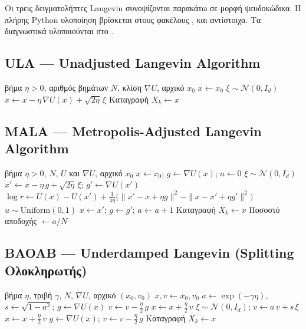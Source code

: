 Οι τρεις δειγματολήπτες Langevin συνοψίζονται παρακάτω σε μορφή ψευδοκώδικα.
Η πλήρης Python υλοποίηση βρίσκεται στους φακέλους
,  και
 αντίστοιχα. Τα διαγνωστικά
υλοποιούνται στο .

\subsection*{ULA --- Unadjusted Langevin Algorithm}

\begin{algorithmic}[1]
\Require βήμα $\eta > 0$, αριθμός βημάτων $N$, κλίση $\nabla U$, αρχικό $x_0$
\State $x \gets x_0$
  \State $\xi \sim \mathcal{N}(0, I_d)$
  \State $x \gets x - \eta\, \nabla U(x) + \sqrt{2\eta}\,\xi$
  \State Καταγραφή $X_k \gets x$
\EndFor
\end{algorithmic}

\subsection*{MALA --- Metropolis-Adjusted Langevin Algorithm}

\begin{algorithmic}[1]
\Require βήμα $\eta > 0$, $N$, $U$ και $\nabla U$, αρχικό $x_0$
\State $x \gets x_0$; $g \gets \nabla U(x)$; $a \gets 0$
  \State $\xi \sim \mathcal{N}(0, I_d)$
  \State $x' \gets x - \eta\, g + \sqrt{2\eta}\,\xi$; \quad $g' \gets \nabla U(x')$
  \State $\log r \gets U(x) - U(x') + \frac{1}{4\eta}\bigl(\|x' - x + \eta g\|^2 - \|x - x' + \eta g'\|^2\bigr)$
  \State $u \sim \mathrm{Uniform}(0,1)$
    \State $x \gets x'$; $g \gets g'$; $a \gets a + 1$
  \EndIf
  \State Καταγραφή $X_k \gets x$
\EndFor
\State Ποσοστό αποδοχής $\gets a / N$
\end{algorithmic}

\subsection*{BAOAB --- Underdamped Langevin (Splitting Ολοκληρωτής)}

\begin{algorithmic}[1]
\Require βήμα $\eta$, τριβή $\gamma$, $N$, $\nabla U$, αρχικό $(x_0, v_0)$
\State $x, v \gets x_0, v_0$
\State $a \gets \exp(-\gamma\eta)$, $s \gets \sqrt{1 - a^2}$; $g \gets \nabla U(x)$
  \State $v \gets v - \tfrac{\eta}{2}\, g$ 
  \State $x \gets x + \tfrac{\eta}{2}\, v$ 
  \State $\xi \sim \mathcal{N}(0, I_d)$; $v \gets a\, v + s\, \xi$ 
  \State $x \gets x + \tfrac{\eta}{2}\, v$ 
  \State $g \gets \nabla U(x)$; $v \gets v - \tfrac{\eta}{2}\, g$ 
  \State Καταγραφή $X_k \gets x$
\EndFor
\end{algorithmic}

